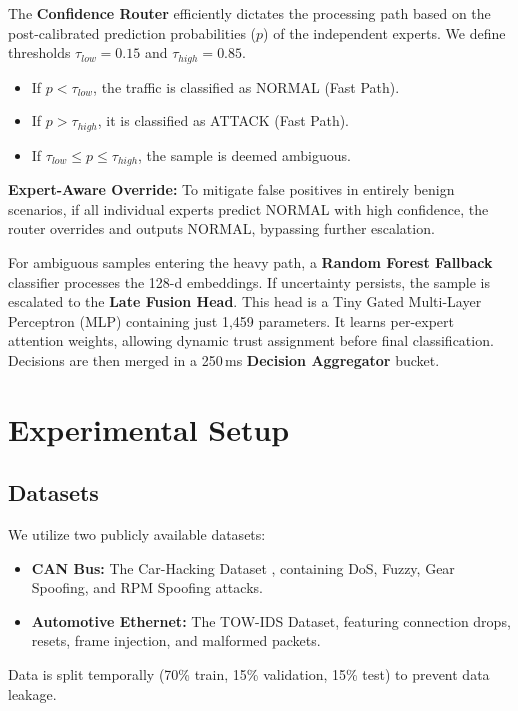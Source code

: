 \documentclass[conference]{IEEEtran}
\begin{document}
The \textbf{Confidence Router} efficiently dictates the processing path based on the post-calibrated prediction probabilities ($p$) of the independent experts. We define thresholds $\tau_{low} = 0.15$ and $\tau_{high} = 0.85$.
\begin{itemize}
    \item If $p < \tau_{low}$, the traffic is classified as NORMAL (Fast Path).
    \item If $p > \tau_{high}$, it is classified as ATTACK (Fast Path).
    \item If $\tau_{low} \leq p \leq \tau_{high}$, the sample is deemed ambiguous.
\end{itemize}

\textbf{Expert-Aware Override:} To mitigate false positives in entirely benign scenarios, if all individual experts predict NORMAL with high confidence, the router overrides and outputs NORMAL, bypassing further escalation.

For ambiguous samples entering the heavy path, a \textbf{Random Forest Fallback} classifier processes the 128-d embeddings. If uncertainty persists, the sample is escalated to the \textbf{Late Fusion Head}. This head is a Tiny Gated Multi-Layer Perceptron (MLP) containing just 1,459 parameters. It learns per-expert attention weights, allowing dynamic trust assignment before final classification. Decisions are then merged in a 250\,ms \textbf{Decision Aggregator} bucket.

\section{Experimental Setup}

\subsection{Datasets}
We utilize two publicly available datasets:
\begin{itemize}
    \item \textbf{CAN Bus:} The Car-Hacking Dataset \cite{car_hacking}, containing DoS, Fuzzy, Gear Spoofing, and RPM Spoofing attacks.
    \item \textbf{Automotive Ethernet:} The TOW-IDS Dataset, featuring connection drops, resets, frame injection, and malformed packets.
\end{itemize}
Data is split temporally (70\% train, 15\% validation, 15\% test) to prevent data leakage.
\end{document}
